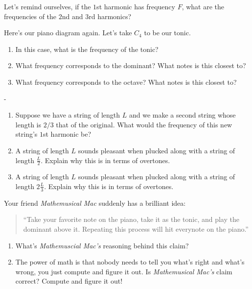 \documentclass[12pt,noauthor,nooutcomes]{ximera}
\begin{document}
\begin{question}
Let's remind ourselves, if the $1$st harmonic has frequency $F$, what are the frequencies of the $2$nd and $3$rd harmonics?

Here's our piano diagram again.
\noStaff
Let's take $C_4$ to be our tonic.
\begin{enumerate}
\item In this case, what is the frequency of the tonic?
\item What frequency corresponds to the dominant? What notes is this closest to?  
\item What frequency corresponds to the octave? What notes is this closest to?  
\end{enumerate}
\end{question}



\begin{question}-
\begin{enumerate}
\item Suppose we have a string of length $L$ and we make a second string whose length is $2/3$ that of the original. What would the frequency of this new string's $1$st harmonic be?
\item A string of length $L$ sounds pleasant when plucked along with a string of length $\frac{L}{2}$. Explain why this is in terms of overtones.
\item A string of length $L$ sounds pleasant when plucked along with a string of length $2\frac{L}{3}$. Explain why this is in terms of overtones.
\end{enumerate}
\end{question}





\begin{question}
Your friend \textit{Mathemusical Mac} suddenly has a brilliant idea:
\begin{quote}
``Take your favorite note on the piano, take it as the tonic, and play the dominant above it. Repeating this process will hit everynote on the piano.''
\end{quote}
\begin{enumerate}
    \item What's \textit{Mathemuscial Mac's} reasoning behind this claim?

\item The power of math is that nobody needs to tell you what's right and what's wrong, you just compute and figure it out. Is \textit{Mathemusical Mac's} claim correct? Compute and figure it out!
\end{enumerate}
\end{question}
\end{document}
